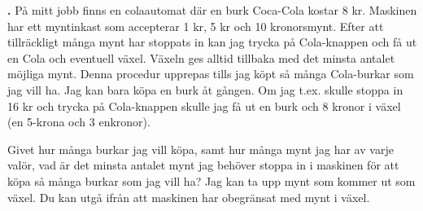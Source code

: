 \documentclass[a4paper,12pt]{article}
\newcounter{iii}\setcounter{iii}{0}
\def\i{\bigskip\noindent\refstepcounter{iii}\textbf{\arabic{iii}.} }
\newcounter{pun}[iii]
\begin{document}

\i
På mitt jobb finns en colaautomat där en burk Coca-Cola kostar 8 kr. Maskinen har ett myntinkast som accepterar 1 kr, 5 kr och 10 kronorsmynt. Efter att tillräckligt många mynt har stoppats in kan jag trycka på Cola-knappen och få ut en Cola och eventuell växel. Växeln ges alltid tillbaka med det minsta antalet möjliga mynt. Denna procedur upprepas tills jag köpt så många Cola-burkar som jag vill ha. Jag kan bara köpa en burk åt gången. Om jag t.ex. skulle stoppa in 16 kr och trycka på Cola-knappen skulle jag få ut en burk och 8 kronor i växel (en 5-krona och 3 enkronor).

Givet hur många burkar jag vill köpa, samt hur många mynt jag har av varje valör, vad är det minsta antalet mynt jag behöver stoppa in i maskinen för att köpa så många burkar som jag vill ha? Jag kan ta upp mynt som kommer ut som växel. Du kan utgå ifrån att maskinen har obegränsat med mynt i växel.
\end{document}
